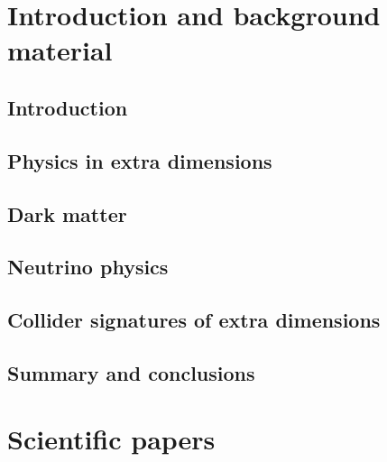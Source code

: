 \documentclass[nocoverpage,swedish,g5paper]{thesis}
\newcommand{\todo}[1]{(\textbf{TODO:} #1)}
\begin{document}

\begin{preface}

\end{preface}

\tableofcontents

\mainmatter

\part{Introduction and background material}

\chapter{Introduction}


\chapter{Physics in extra dimensions}\label{ch:ExtraDimensions}


\chapter{Dark matter}\label{ch:DarkMatter}


\chapter{Neutrino physics}\label{ch:NeutrinoPhysics}


\chapter{Collider signatures of extra dimensions}\label{ch:ColliderPhenomenology}


\chapter{Summary and conclusions}\label{ch:Summary}



%




\part{Scientific papers}


\end{document}
